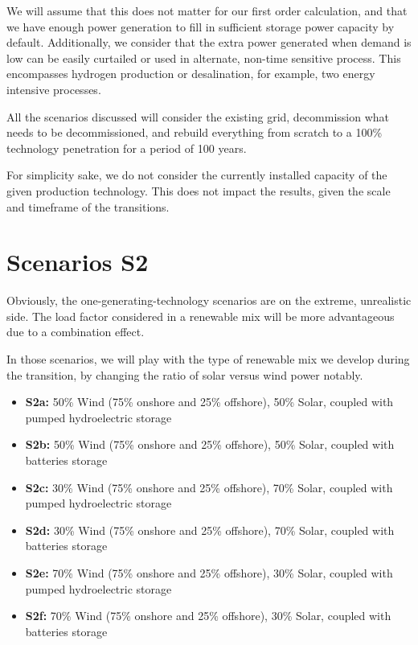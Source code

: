We will assume that this does not matter for our first order calculation, and that we have enough power generation to fill in sufficient storage power capacity by default. Additionally, we consider that the extra power generated when demand is low can be easily curtailed or used in alternate, non-time sensitive process. This encompasses hydrogen production or desalination, for example, two energy intensive processes.

All the scenarios discussed will consider the existing grid, decommission what needs to be decommissioned, and rebuild everything from scratch to a 100\% technology penetration for a period of 100 years.

For simplicity sake, we do not consider the currently installed capacity of the given production technology. This does not impact the results, given the scale and timeframe of the transitions.


\section{Scenarios S2}

Obviously, the one-generating-technology scenarios are on the extreme, unrealistic side. The load factor considered in a renewable mix will be more advantageous due to a combination effect.

In those scenarios, we will play with the type of renewable mix we develop during the transition, by changing the ratio of solar versus wind power notably.


\begin{kaobox}[frametitle=S2 scenarios]
\begin{itemize}
	\item \textbf{S2a:} 50\% Wind (75\% onshore and 25\% offshore), 50\% Solar, coupled with pumped hydroelectric storage
	\item \textbf{S2b:} 50\% Wind (75\% onshore and 25\% offshore), 50\% Solar, coupled with batteries storage
	\item \textbf{S2c:} 30\% Wind (75\% onshore and 25\% offshore), 70\% Solar, coupled with pumped hydroelectric storage
	\item \textbf{S2d:} 30\% Wind (75\% onshore and 25\% offshore), 70\% Solar, coupled with batteries storage
	\item \textbf{S2e:} 70\% Wind (75\% onshore and 25\% offshore), 30\% Solar, coupled with pumped hydroelectric storage
	\item \textbf{S2f:} 70\% Wind (75\% onshore and 25\% offshore), 30\% Solar, coupled with batteries storage
\end{itemize}
\end{kaobox}


